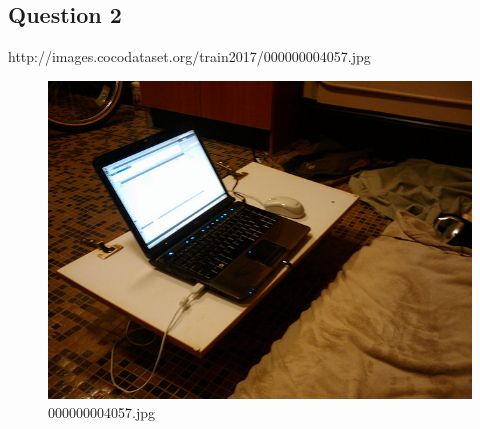 \subsection*{Question 2}
http://images.cocodataset.org/train2017/000000004057.jpg
    \begin{figure}[h]
        \centering
        \includegraphics[width=0.8\linewidth]{../image set/easy/000000004057.jpg}
        \caption{000000004057.jpg}
    \end{figure}
